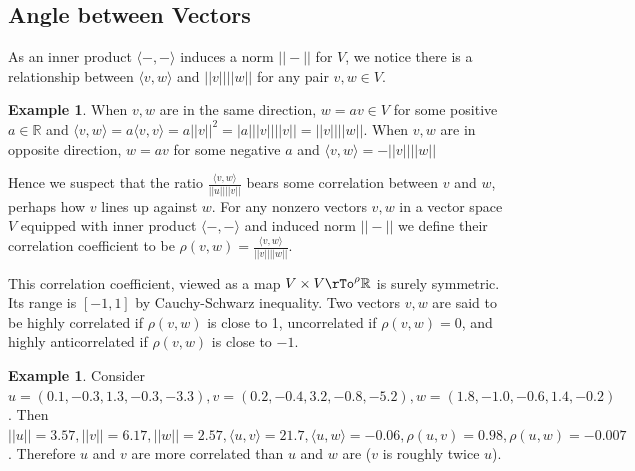 \documentclass[12pt]{amsart}
\theoremstyle{definition}
\newtheorem{example}[theorem]{Example}
\begin{document}
\subsection{Angle between Vectors} As an inner product $\langle  - , - \rangle$ induces a norm $||-||$ for $V$, we notice there is a relationship between $\langle v, w \rangle$ and $||v|| ||w||$ for any pair $v, w \in V$.
\begin{example} When $v, w$ are in the same direction, $w = a v \in V$ for some positive $a \in \mathbb{R}$ and $\langle v, w \rangle = a \langle v, v \rangle = a ||v||^2 = |a|||v|| ||v|| = ||v|| ||w||$. When $v, w$ are in opposite direction, $w = a v$ for some negative $a$ and $\langle v, w \rangle = - ||v|| ||w||$
\end{example}

Hence we suspect that the ratio $\frac{\langle v, w \rangle}{||u|| ||v||}$ bears some correlation between $v$ and $w$, perhaps how $v$ lines up against $w$.
\dfn For any nonzero vectors $v, w$ in a vector space $V$ equipped with inner product $\langle - , - \rangle$ and induced norm $||-||$ we define their correlation coefficient to be $\rho(v, w) = \frac{\langle v, w \rangle}{||v|| ||w||}$.

This correlation coefficient, viewed as a map $V \times V \rTo^{\rho} \mathbb{R}$ is surely symmetric. Its range is $[-1,1]$ by Cauchy-Schwarz inequality. Two vectors $v, w$ are said to be highly correlated if $\rho(v, w)$ is close to 1, uncorrelated if $\rho(v, w) = 0$, and highly anticorrelated if $\rho(v, w)$ is close to $-1$.

\begin{example} Consider $u = (0.1, -0.3, 1.3, -0.3, -3.3), v = (0.2, -0.4, 3.2, -0.8, -5.2), w = (1.8, -1.0, -0.6, 1.4, -0.2)$. Then $||u|| = 3.57, ||v|| = 6.17, ||w|| = 2.57, \langle u, v \rangle = 21.7, \langle u, w \rangle = -0.06, \rho(u, v) = 0.98, \rho(u, w) = -0.007$. Therefore $u$ and $v$ are more correlated than $u$ and $w$ are ($v$ is roughly twice $u$).
\end{example}
\end{document}
